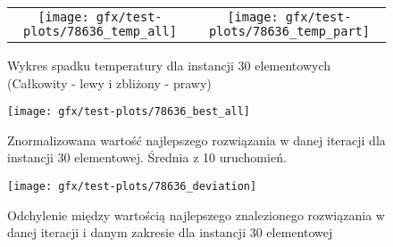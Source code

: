 \begin{figure}[H]
\centering
\begin{table}[H]
\centering
\begin{tabularx}{1\textwidth}{ c c }
\texttt{[image: gfx/test-plots/78636\_temp\_all]} & \texttt{[image: gfx/test-plots/78636\_temp\_part]} \\

\end{tabularx}
\end{table}
\caption{Wykres spadku temperatury dla instancji 30 elementowych (Całkowity - lewy i zbliżony - prawy)}
\end{figure}
\begin{figure}[H]
\centering
\texttt{[image: gfx/test-plots/78636\_best\_all]}
\caption{Znormalizowana wartość najlepszego rozwiązania w danej iteracji dla instancji 30 elementowej. Średnia z 10 uruchomień.}
\end{figure}
\begin{figure}[H]
\centering
\texttt{[image: gfx/test-plots/78636\_deviation]}
\caption{Odchylenie między wartością najlepszego znalezionego rozwiązania w danej iteracji i danym zakresie dla instancji 30 elementowej}
\end{figure}


